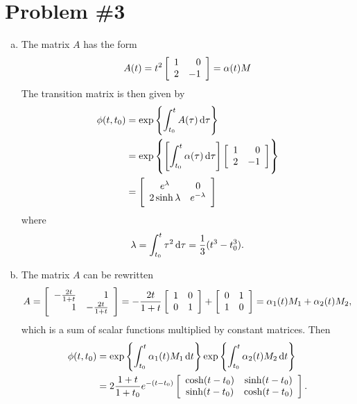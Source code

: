 \documentclass{article}
\begin{document}
\section*{Problem \#3}
\begin{enumerate}[(a)]
  \item{
    The matrix $A$ has the form
    $$
      A(t)
    = t^2
      \left[\begin{array}{r r}
        1 &  0 \\
        2 & -1
      \end{array}\right]
    = \alpha(t) M
    $$
    The transition matrix is then given by
    \begin{align*}
         \phi(t, t_0)
      &= \exp\left\{
           \int_{t_0}^{t} A(\tau) \dif\tau
         \right\} \\
      &= \exp\left\{
           \left[
             \int_{t_0}^t \alpha(\tau) \dif\tau
           \right]
           \left[\begin{array}{r r}
             1 &  0 \\
             2 & -1
           \end{array}\right]
         \right\} \\
      &= \left[\begin{array}{c c}
           e^\lambda         & 0 \\
           2 \sinh \lambda & e^{-\lambda}
         \end{array}\right]
    \end{align*}
    where
    $$
      \lambda
    = \int_{t_0}^{t} \tau^2 \dif\tau
    = \frac{1}{3}(t^3 - t_0^3).
    $$
  }
  \item{
    The matrix $A$ can be rewritten
    $$
    A
    =
    \left[\begin{array}{r r}
      -\frac{2t}{1 + t} & 1                 \\
       1                & -\frac{2t}{1 + t}
    \end{array}\right]
    =
    -\frac{2t}{1 + t}
    \left[\begin{array}{r r}
       1 & 0 \\
       0 & 1
    \end{array}\right]
    +
    \left[\begin{array}{r r}
       0 & 1 \\
       1 & 0
    \end{array}\right]
    =
    \alpha_1(t) M_1 + \alpha_2(t) M_2,
    $$
    which is a sum of scalar functions multiplied by constant
    matrices. Then
    \begin{align*}
    \phi(t, t_0)
    &=
    \exp \left\{
      \int_{t_0}^{t} \alpha_1(t) M_1 \dif t
    \right\}
    \exp \left\{
      \int_{t_0}^{t} \alpha_2(t) M_2 \dif t
    \right\} \\
    &=
    2\frac{1 + t}{1 + t_0}e^{-(t - t_0)}
    \left[\begin{array}{c c}
       \cosh (t - t_0) & \sinh (t - t_0) \\
       \sinh (t - t_0) & \cosh (t - t_0)
    \end{array}\right].
    \end{align*}
  }
\end{enumerate}
\end{document}
